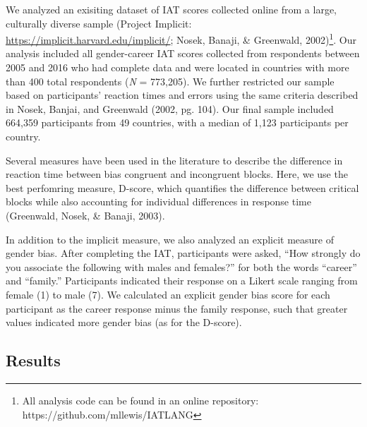 \documentclass[10pt, letterpaper]{article}
\begin{document}
We analyzed an exisiting dataset of IAT scores collected online from a
large, culturally diverse sample (Project Implicit:
\url{https://implicit.harvard.edu/implicit/}; Nosek, Banaji, \&
Greenwald,
2002)\footnote{All analysis code can be found in an online repository: https://github.com/mllewis/IATLANG}.
Our analysis included all gender-career IAT scores collected from
respondents between 2005 and 2016 who had complete data and were located
in countries with more than 400 total respondents (\emph{N} = 773,205).
We further restricted our sample based on participants' reaction times
and errors using the same criteria described in Nosek, Banjai, and
Greenwald (2002, pg. 104). Our final sample included 664,359
participants from 49 countries, with a median of 1,123 participants per
country.

Several measures have been used in the literature to describe the
difference in reaction time between bias congruent and incongruent
blocks. Here, we use the best perfomring measure, D-score, which
quantifies the difference between critical blocks while also accounting
for individual differences in response time (Greenwald, Nosek, \&
Banaji, 2003).

In addition to the implicit measure, we also analyzed an explicit
measure of gender bias. After completing the IAT, participants were
asked, ``How strongly do you associate the following with males and
females?'' for both the words ``career'' and ``family.'' Participants
indicated their response on a Likert scale ranging from female (1) to
male (7). We calculated an explicit gender bias score for each
participant as the career response minus the family response, such that
greater values indicated more gender bias (as for the D-score).

\subsection{Results}\label{results}
\end{document}

